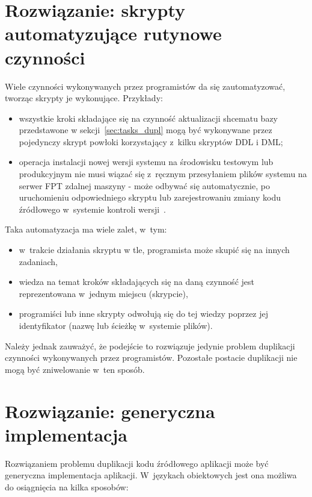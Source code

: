 \section{Rozwiązanie: skrypty automatyzujące rutynowe czynności} \label{sec:tasks_scripts}

Wiele czynności wykonywanych przez programistów da się zautomatyzować, tworząc skrypty je wykonujące.
Przykłady:

\begin{itemize}
 \item wszystkie kroki składające się na czynność aktualizacji shcematu bazy przedstawone w sekcji~\ref{sec:tasks_dupl} mogą być wykonywane przez pojedynczy skrypt powłoki korzystający z~kilku skryptów DDL i DML;
 \item operacja instalacji nowej wersji systemu na środowisku testowym lub produkcyjnym nie musi wiązać się z~ręcznym przesyłaniem plików systemu na serwer FPT zdalnej maszyny - może odbywać się automatycznie, po uruchomieniu odpowiedniego skryptu lub zarejestrowaniu zmiany kodu źródłowego w~systemie kontroli wersji~\cite{cont_delivery}.
\end{itemize}

Taka automatyzacja ma wiele zalet, w~tym:

\begin{itemize}
 \item w~trakcie działania skryptu w tle, programista może skupić się na innych zadaniach,
 \item wiedza na temat kroków składających się na daną czynność jest reprezentowana w~jednym miejscu (skrypcie),
 \item programiści lub inne skrypty odwołują się do tej wiedzy poprzez jej identyfikator (nazwę lub ścieżkę w~systemie plików).
\end{itemize}

Należy jednak zauważyć, że podejście to rozwiązuje jedynie problem duplikacji czynności wykonywanych przez programistów.
Pozostałe postacie duplikacji nie mogą być zniwelowanie w~ten sposób.



\section{Rozwiązanie: generyczna implementacja}

Rozwiązaniem problemu duplikacji kodu źródłowego aplikacji może być generyczna implementacja aplikacji.
W~językach obiektowych jest ona możliwa do osiągnięcia na kilka sposobów:



